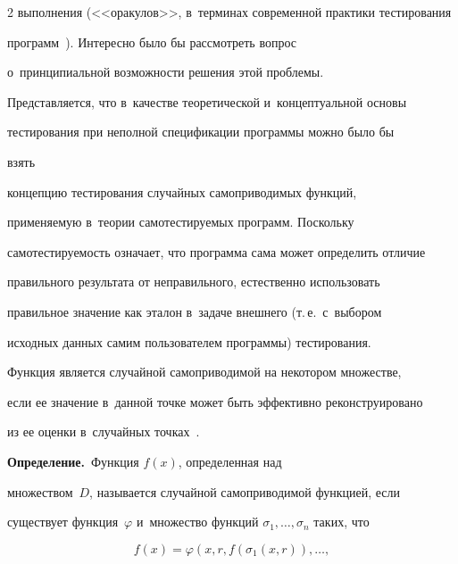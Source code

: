 \begin{multicols}{2}
выполнения (<<оракулов>>, в~терминах современной практики тес\-ти\-ро\-ва\-ния 


программ~\cite{4-bf}). Интересно было бы рассмотреть вопрос 


о~принципиальной воз\-мож\-ности решения этой проблемы.


    


    Представляется, что в~качестве теоретической и~концептуальной основы 


тестирования при неполной спецификации программы можно было бы\linebreak


 взять 


концепцию тестирования случайных самопри\-во\-ди\-мых функций, 


применяемую в~тео\-рии самотестируемых программ. Поскольку 


самотестируемость означает, что программа сама может определить отличие 


правильного результата от неправильного, естественно использовать 


правильное значение как эталон в~задаче внешнего (т.\,е.\ с~выбором 


исходных данных самим пользователем программы) тестирования.


    


    Функция является случайной самоприводимой на некотором множестве, 


если ее значение в~данной точке может быть эффективно реконструировано 


из ее оценки в~случайных точках~\cite{5-bf, 13-bf}.


    


    \smallskip


    


    \noindent


    \textbf{Определение.}\ Функция $f(x)$, определенная над 


множеством~$D$, называется случайной самоприводимой функцией, если 


существует функция~$\varphi$ и~множество функций $\sigma_1, \ldots , 


\sigma_n$ таких, что


    \begin{equation}


    f(x)=\varphi\left(x, r, f\left( \sigma_1\left(x,r\right)\right),\ldots , 



\end{equation}
\end{multicols}
